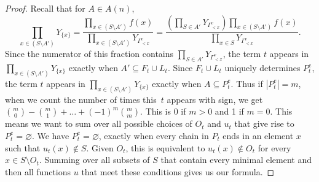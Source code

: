 \documentclass[pdftex]{sigma}
\numberwithin{equation}{section}
\begin{document}
\begin{proof}
Recall that for $A\in A(n)$,
\[ \prod_{x\in (S\setminus A')}Y_{\{x\}}=\frac{\prod_{x\in (S\setminus A')}f(x)}{\prod_{x\in (S\setminus A')}Y_{\Gamma_{< x}^v}}=\frac{\left(\prod_{S\in A'} Y_{\Gamma_{< x}^v}\right)\prod_{x\in (S\setminus A')}f(x)}{\prod_{x\in S}Y_{\Gamma_{< x}^v}}.\]
Since the numerator of this fraction contains $\prod_{S\in A'} Y_{\Gamma_{< x}^v}$, the term $t$ appears in $\prod_{x\in (S\setminus A')}Y_{\{x\}}$ exactly when $A'\subseteq F_t\cup L_t$. Since $F_t\cup L_t$ uniquely determines $P_t^e$, the term $t$ appears in $\prod_{x\in (S\setminus A')}Y_{\{x\}}$ exactly when $A\subseteq P_t^e$. Thus if $|P_t^e|=m$, when we count the number of times this~$t$ appears with sign, we get ${m \choose 0}-{m \choose 1}+\dots+(-1)^{m}{m \choose m}$. This is 0 if $m>0$ and 1 if $m=0$.
This means we want to sum over all possible choices of $O_t$ and $u_t$ that give rise to $P_t^e=\varnothing$. We have $P_t^e=\varnothing$, exactly when every chain in $P_t$ ends in an element $x$ such that $u_t(x)\not\in S$. Given $O_t$, this is equivalent to $u_t(x)\not\in O_t$ for every $x\in S\setminus O_t$. Summing over all subsets of $S$ that contain every minimal element and then all functions $u$ that meet these conditions gives us our formula.
\end{proof}
\end{document}
